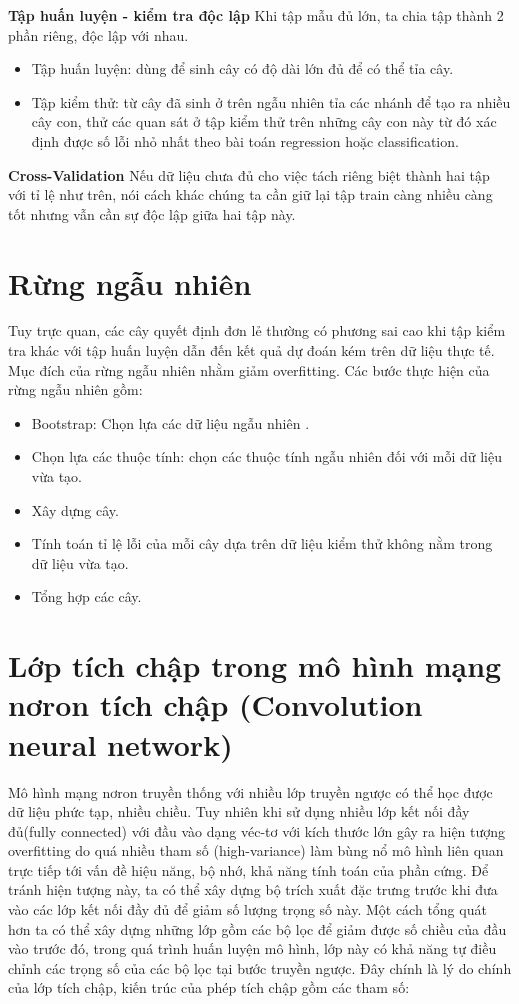 \textbf{Tập huấn luyện - kiểm tra độc lập}
Khi tập mẫu đủ lớn, ta chia tập thành 2 phần riêng, độc lập với nhau.
\begin{itemize}
\item Tập huấn luyện: dùng để sinh cây có độ dài lớn đủ để có thể tỉa cây.
\item Tập kiểm thử: từ cây đã sinh ở trên ngẫu nhiên tỉa các nhánh để tạo ra nhiều cây con, thử các quan sát ở tập kiểm thử trên những cây con này từ đó xác định được số lỗi nhỏ nhất theo bài toán regression hoặc classification.
\end{itemize}
\textbf{Cross-Validation}
Nếu dữ liệu chưa đủ cho việc tách riêng biệt thành hai tập với tỉ lệ như trên, nói cách khác chúng ta cần giữ lại tập train càng nhiều càng tốt nhưng vẫn cần sự độc lập giữa hai tập này.
\section{Rừng ngẫu nhiên}
Tuy trực quan, các cây quyết định đơn lẻ thường có phương sai cao khi tập kiểm tra khác với tập huấn luyện dẫn đến kết quả dự đoán kém trên dữ liệu thực tế. Mục đích của rừng ngẫu nhiên nhằm giảm overfitting. Các bước thực hiện của rừng ngẫu nhiên gồm\cite{1}:
\begin{itemize}
\item Bootstrap: Chọn lựa các dữ liệu ngẫu nhiên .
\item Chọn lựa các thuộc tính: chọn các thuộc tính ngẫu nhiên đối với mỗi dữ liệu vừa tạo.
\item Xây dựng cây.
\item Tính toán tỉ lệ lỗi của mỗi cây dựa trên dữ liệu kiểm thử không nằm trong dữ liệu vừa tạo.
\item Tổng hợp các cây.
\end{itemize}

\section{Lớp tích chập trong mô hình mạng nơron tích chập (Convolution neural network)} 
Mô hình mạng nơron truyền thống với nhiều lớp truyền ngược có thể học được dữ liệu phức tạp, nhiều chiều. Tuy nhiên khi sử dụng nhiều lớp kết nối đầy đủ(fully connected) với đầu vào dạng véc-tơ với kích thước lớn gây ra hiện tượng overfitting do quá nhiều tham số (high-variance) làm bùng nổ mô hình liên quan trực tiếp tới vấn đề hiệu năng, bộ nhớ, khả năng tính toán của phần cứng. Để tránh hiện tượng này, ta có thể xây dựng bộ trích xuất đặc trưng trước khi đưa vào các lớp kết nối đầy đủ để giảm số lượng trọng số này. Một cách tổng quát hơn ta có thể xây dựng những lớp gồm các bộ lọc để giảm được số chiều của đầu vào trước đó, trong quá trình huấn luyện mô hình, lớp này có khả năng tự điều chỉnh các trọng số của các bộ lọc tại bước truyền ngược. Đây chính là lý do chính của lớp tích chập, kiến trúc của phép tích chập gồm các tham số:

